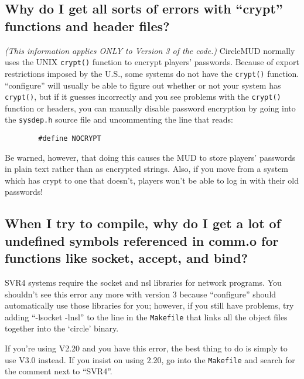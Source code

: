 \documentclass[11pt]{article}
\begin{document}
\subsection{Why do I get all sorts of errors with ``crypt'' functions and header files?}
{\em (This information applies ONLY to Version 3 of the code.)} CircleMUD normally uses the UNIX \texttt{crypt()} function to encrypt players' passwords.  Because of export restrictions imposed by the U.S., some systems do not have the \texttt{crypt()} function. ``configure'' will usually be able to figure out whether or not your system has \texttt{crypt()}, but if it guesses incorrectly and you see problems with the \texttt{crypt()} function or headers, you can manually disable password encryption by going into the \texttt{sysdep.h} source file and uncommenting the line that reads:
\begin{verbatim}
        #define NOCRYPT
\end{verbatim}
Be warned, however, that doing this causes the MUD to store players' passwords in plain text rather than as encrypted strings.  Also, if you move from a system which has crypt to one that doesn't, players won't be able to log in with their old passwords! 

\subsection{When I try to compile, why do I get a lot of undefined symbols referenced in comm.o for functions like socket, accept, and bind?}
SVR4 systems require the socket and nsl libraries for network programs.  You shouldn't see this error any more with version 3 because ``configure'' should automatically use those libraries for you; however, if you still have problems, try adding ``-lsocket -lnsl'' to the line in the \texttt{Makefile} that links all the object files together into the `circle' binary. 
\par
If you're using V2.20 and you have this error, the best thing to do is simply to use V3.0 instead.  If you insist on using 2.20, go into the \texttt{Makefile} and search for the comment next to ``SVR4''.
\end{document}
